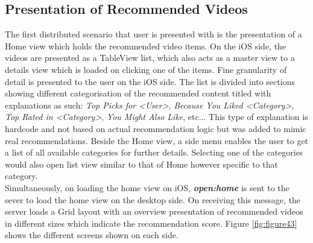 \subsection{Presentation of Recommended Videos}
The first distributed scenario that user is presented with is the presentation of a Home view which holds the recommended video items. On the iOS side, the videos are presented as a TableView list, which also acts as a master view to a details view  which is loaded on clicking one of the items. Fine granularity of detail is presented to the user on the iOS side. The list is divided into sections showing different categorisation of the recommended content titled with explanations as such: \textit{Top Picks for <User>}, \textit{Because You Liked <Category>}, \textit{Top Rated in <Category>}, \textit{You Might Also Like}, etc... This type of explanation is hardcode and not based on actual recommendation logic but was added to mimic real recommendations. Beside the Home view, a side menu enables the user to get a list of all available categories for further details. Selecting one of the categories would also open list view similar to that of Home however specific to that category.\\
Simultaneously, on loading the home view on iOS, \textbf{\textit{open:home}} is sent to the sever to load the home view on the desktop side. On receiving this message, the server loads a Grid layout with an overview presentation of recommended videos in different sizes which indicate the recommendation score. Figure \ref{fig:figure43} shows the different screens shown on each side.
